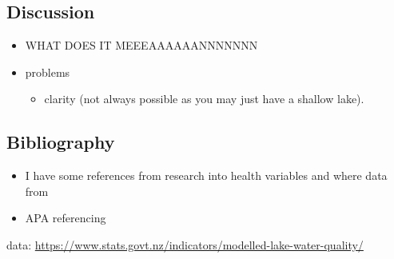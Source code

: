\documentclass[
]{article}
\providecommand{\tightlist}{%
  \setlength{\itemsep}{0pt}\setlength{\parskip}{0pt}}
\begin{document}
\hypertarget{discussion}{%
\subsection{Discussion}\label{discussion}}

\begin{itemize}
\tightlist
\item
  WHAT DOES IT MEEEAAAAAANNNNNNN
\item
  problems

  \begin{itemize}
  \tightlist
  \item
    clarity (not always possible as you may just have a shallow lake).
  \end{itemize}
\end{itemize}

\hypertarget{bibliography}{%
\subsection{Bibliography}\label{bibliography}}

\begin{itemize}
\tightlist
\item
  I have some references from research into health variables and where data from
\item
  APA referencing
\end{itemize}

data: \url{https://www.stats.govt.nz/indicators/modelled-lake-water-quality/}
\end{document}

